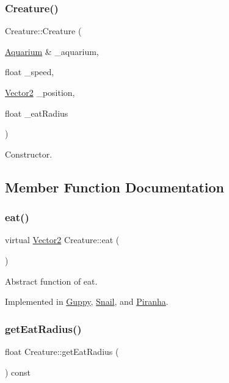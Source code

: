 \subsubsection{\texorpdfstring{Creature()}{Creature()}}
{\footnotesize\ttfamily Creature\+::\+Creature (\begin{DoxyParamCaption}\item[{\mbox{\hyperlink{class_aquarium}{Aquarium}} \&}]{\+\_\+aquarium,  }\item[{float}]{\+\_\+speed,  }\item[{\mbox{\hyperlink{struct_vector2}{Vector2}}}]{\+\_\+position,  }\item[{float}]{\+\_\+eat\+Radius }\end{DoxyParamCaption})}



Constructor. 



\subsection{Member Function Documentation}
\mbox{\label{class_creature_a0d531a4c04c1021833ddb0e48864dbf4}} 
\subsubsection{\texorpdfstring{eat()}{eat()}}
{\footnotesize\ttfamily virtual \mbox{\hyperlink{struct_vector2}{Vector2}} Creature\+::eat (\begin{DoxyParamCaption}{ }\end{DoxyParamCaption})\hspace{0.3cm}{\ttfamily [pure virtual]}}



Abstract function of eat. 



Implemented in \mbox{\hyperlink{class_guppy_aaeab888b423fd0ea3cc911b974b04f48}{Guppy}}, \mbox{\hyperlink{class_snail_a0905a469c6333970b8246abca37795f1}{Snail}}, and \mbox{\hyperlink{class_piranha_a125847235bdbd0e8c676dcada0d86c14}{Piranha}}.

\mbox{\label{class_creature_a24e52cedddd872269f83671c9a6f6925}} 
\subsubsection{\texorpdfstring{get\+Eat\+Radius()}{getEatRadius()}}
{\footnotesize\ttfamily float Creature\+::get\+Eat\+Radius (\begin{DoxyParamCaption}{ }\end{DoxyParamCaption}) const}



